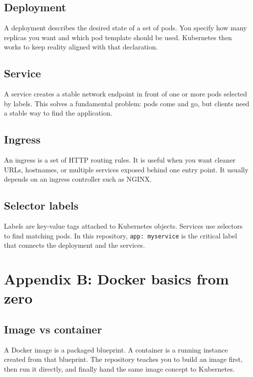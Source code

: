 \documentclass[11pt,a4paper]{article}
\newcommand{\cmd}[1]{\texttt{#1}}
\begin{document}
\subsection{Deployment}

A deployment describes the desired state of a set of pods. You specify how many replicas you want and which pod template should be used. Kubernetes then works to keep reality aligned with that declaration.

\subsection{Service}

A service creates a stable network endpoint in front of one or more pods selected by labels. This solves a fundamental problem: pods come and go, but clients need a stable way to find the application.

\subsection{Ingress}

An ingress is a set of HTTP routing rules. It is useful when you want cleaner URLs, hostnames, or multiple services exposed behind one entry point. It usually depends on an ingress controller such as NGINX.

\subsection{Selector labels}

Labels are key-value tags attached to Kubernetes objects. Services use selectors to find matching pods. In this repository, \cmd{app: myservice} is the critical label that connects the deployment and the services.

\section{Appendix B: Docker basics from zero}

\subsection{Image vs container}

A Docker image is a packaged blueprint. A container is a running instance created from that blueprint. The repository teaches you to build an image first, then run it directly, and finally hand the same image concept to Kubernetes.
\end{document}
